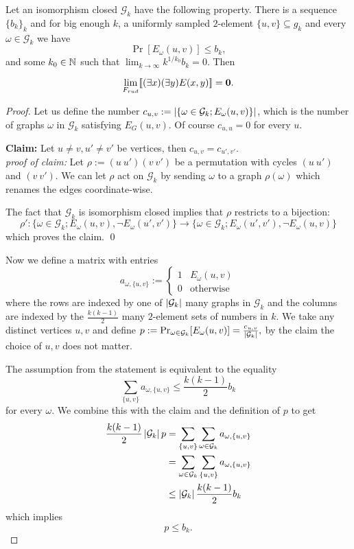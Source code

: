 \begin{thrm}\label{thrmsparse}
Let an isomorphism closed $\mathcal{G}_k$ have the following property. There is a sequence $\{b_k\}_{k}$ and for big enough $k$, a uniformly sampled $2$-element $\{u,v\}\subseteq g_k$ and every $\omega\in\mathcal{G}_k$ we have
\[\Pr[E_\omega(u,v)]\leq b_k,\]
and some $k_0\in\mathbb{N}$ such that $\lim_{k\to\infty}k^{1/k_0}b_k = 0.$ Then

\[\lim_{F_{rud}}[\![(\exists x)(\exists y)E(x,y)]\!]=\textbf{0}.\]
\end{thrm}
\begin{proof}
Let us define the number $c_{u,v}:=\left|{\{\omega\in\mathcal{G}_k; E_\omega(u,v)\}}\right|$, which is the number of graphs $\omega$ in $\mathcal{G}_k$ satisfying $E_G(u,v)$. Of course $c_{u,u}=0$ for every $u$.

\vspace{0.5em}
\textbf{Claim:} Let $u\neq v,u'\neq v'$ be vertices, then $c_{u,v}=c_{u',v'}$.\\
\textit{proof of claim:} Let $\rho:=(u\:u')(v\:v')$ be a permutation with cycles $(u\:u')$ and $(v\:v')$. We can let $\rho$ act on $\mathcal{G}_k$ by sending $\omega$ to a graph $\rho(\omega)$ which renames the edges coordinate-wise.

The fact that $\mathcal{G}_k$ is isomorphism closed implies that $\rho$ restricts to a bijection:
\[\rho':\{\omega\in\mathcal{G}_k;E_\omega(u,v), \lnot E_\omega(u',v')\}\to \{\omega\in\mathcal{G}_k;E_\omega(u',v'),\lnot E_\omega(u,v)\}\]
which proves the claim. \qed
\vspace{0.5em}

Now we define a matrix with entries
\[a_{\omega,\{u,v\}}:=\begin{cases}1&E_\omega(u,v)\\0&\text{otherwise}\end{cases}\]
where the rows are indexed by one of $\left|{\mathcal{G}_k}\right|$ many graphs in $\mathcal{G}_k$ and the columns are indexed by the $\frac{k(k-1)}{2}$ many $2$-element sets of numbers in $k$. We take any distinct vertices $u,v$ and define $p:=\Pr_{\omega\in \mathcal{G}_k}[E_\omega(u,v)]=\frac{c_{u,v}}{\left|{\mathcal{G}_k}\right|},$ by the claim the choice of $u,v$ does not matter.

The assumption from the statement is equivalent to the equality 
\[\sum_{\{u,v\}}a_{\omega,\{u,v\}}\leq \frac{k(k-1)}{2}b_k\] 
for every $\omega$. We combine this with the claim and the definition of $p$ to get
\begin{align}
\frac{k(k-1)}{2}\left|{\mathcal{G}_k}\right|p&=\sum_{\{u,v\}}\sum_{\omega\in\mathcal{G}_k}a_{\omega,\{u,v\}}\\
&=\sum_{\omega\in\mathcal{G}_k}\sum_{\{u,v\}}a_{\omega,\{u,v\}}\\
&\leq \left|{\mathcal{G}_k}\right|\frac{k(k-1)}{2}b_k
\end{align}
which implies
\[p\leq b_k.\]


\end{proof}
